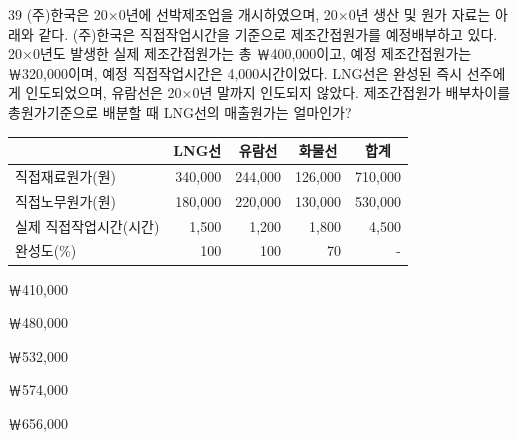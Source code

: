 \begin{question}{39}
(주)한국은 20×0년에 선박제조업을 개시하였으며, 20×0년 생산 및 원가 자료는 아래와 같다. (주)한국은 직접작업시간을 기준으로 제조간접원가를 예정배부하고 있다. 20×0년도 발생한 실제 제조간접원가는 총 ￦400,000이고, 예정 제조간접원가는 ￦320,000이며, 예정 직접작업시간은 4,000시간이었다. LNG선은 완성된 즉시 선주에게 인도되었으며, 유람선은 20×0년 말까지 인도되지 않았다. 제조간접원가 배부차이를 총원가기준으로 배분할 때 LNG선의 매출원가는 얼마인가?

{\small\centering
\begin{tabular}{|l|r|r|r|r|}
\hline
 & \multicolumn{1}{c|}{LNG선} & \multicolumn{1}{c|}{유람선} & \multicolumn{1}{c|}{화물선} & \multicolumn{1}{c|}{합계} \\
\hline
직접재료원가(원) & 340,000 & 244,000 & 126,000 & 710,000 \\
직접노무원가(원) & 180,000 & 220,000 & 130,000 & 530,000 \\
실제 직접작업시간(시간) & 1,500 & 1,200 & 1,800 & 4,500 \\
완성도(\%) & 100 & 100 & 70 & - \\
\hline
\end{tabular}\par}

\begin{choices}
  \item ￦410,000
  \item ￦480,000
  \item ￦532,000
  \item ￦574,000
  \item ￦656,000
\end{choices}
\end{question}
